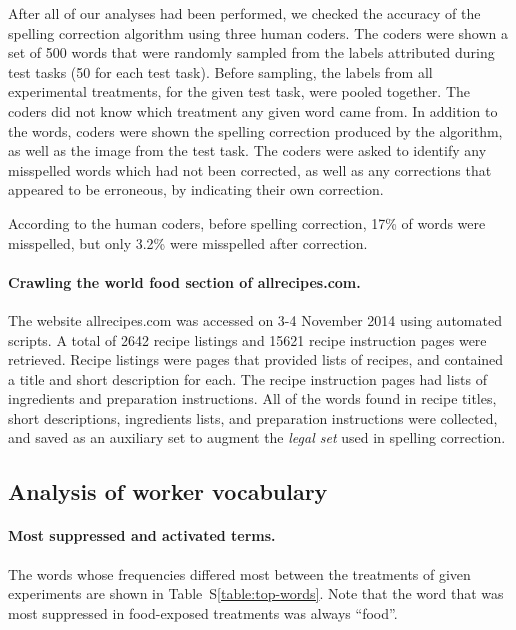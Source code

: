 \documentclass[12pt]{article}
\begin{document}
	After all of our analyses had been performed, we checked the accuracy of 
	the spelling correction algorithm using three human coders.  The coders
	were shown a set of 
	500 words that were randomly sampled from the labels attributed during 
	test tasks (50 for each test task).  Before sampling, the labels from all
	experimental treatments, for the given test task, were pooled together.
	The coders did not know which treatment any given word came from.  
	In addition to the words, coders were shown the spelling correction 
	produced by the algorithm, as well as the image from the test task.
	The coders were asked to identify any misspelled words which had not 
	been corrected, as well as any corrections that appeared to be erroneous,
	by indicating their own correction.

	According to the human coders, before spelling correction, 17\% of words 
	were misspelled, but only 3.2\% were misspelled after correction.

	\paragraph{Crawling the world food section of allrecipes.com.}
	The website allrecipes.com was accessed on 3-4 November 2014 using 
	automated scripts.  A total of 2642 recipe listings and 15621 recipe
	instruction pages were retrieved.  Recipe listings were pages that 
	provided lists of recipes, and contained a title and short description 
	for each.  
	The recipe instruction pages had lists of ingredients and preparation 
	instructions.  All of the words found in recipe titles, short
	descriptions, ingredients lists, and preparation instructions were
	collected, and saved as an auxiliary set to augment the \textit{legal set}
	used in spelling correction.
	

\subsection*{Analysis of worker vocabulary}
\paragraph{Most suppressed and activated terms.}
The words whose frequencies differed most between the treatments of given 
experiments are shown in Table~S\ref{table:top-words}.  Note that 
the word that was most suppressed in food-exposed treatments was always 
``food''.
\end{document}
